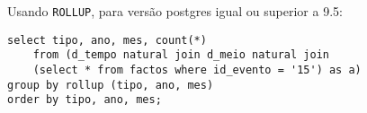 \documentclass[10pt,a4paper]{article}
\begin{document}
Usando \texttt{ROLLUP}, para versão postgres igual ou superior a 9.5:

\begin{verbatim}
select tipo, ano, mes, count(*)
    from (d_tempo natural join d_meio natural join
    (select * from factos where id_evento = '15') as a)
group by rollup (tipo, ano, mes)
order by tipo, ano, mes;
\end{verbatim}
\end{document}

